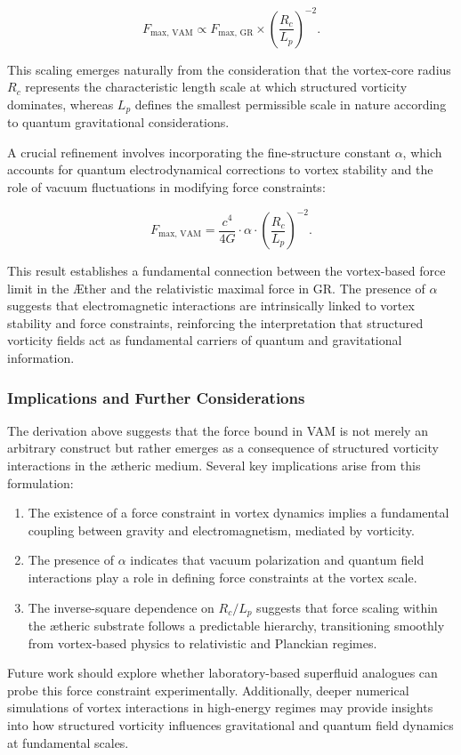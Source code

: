 \begin{equation*}
F_{\text{max, VAM}} \propto F_{\text{max, GR}} \times \left(\frac{R_c}{L_p}\right)^{-2}.
\end{equation*}


This scaling emerges naturally from the consideration that the vortex-core radius $R_c$ represents the characteristic length scale at which structured vorticity dominates, whereas $L_p$ defines the smallest permissible scale in nature according to quantum gravitational considerations.


A crucial refinement involves incorporating the fine-structure constant $\alpha$, which accounts for quantum electrodynamical corrections to vortex stability and the role of vacuum fluctuations in modifying force constraints:


\begin{equation*}
F_{\text{max, VAM}} = \frac{c^4}{4G} \cdot \alpha \cdot \left(\frac{R_c}{L_p}\right)^{-2}.
\end{equation*}


This result establishes a fundamental connection between the vortex-based force limit in the Æther and the relativistic maximal force in GR. The presence of $\alpha$ suggests that electromagnetic interactions are intrinsically linked to vortex stability and force constraints, reinforcing the interpretation that structured vorticity fields act as fundamental carriers of quantum and gravitational information.


\subsubsection*{Implications and Further Considerations}
The derivation above suggests that the force bound in VAM is not merely an arbitrary construct but rather emerges as a consequence of structured vorticity interactions in the ætheric medium. Several key implications arise from this formulation:
\begin{enumerate}
\item The existence of a force constraint in vortex dynamics implies a fundamental coupling between gravity and electromagnetism, mediated by vorticity.
\item The presence of $\alpha$ indicates that vacuum polarization and quantum field interactions play a role in defining force constraints at the vortex scale.
\item The inverse-square dependence on $R_c/L_p$ suggests that force scaling within the ætheric substrate follows a predictable hierarchy, transitioning smoothly from vortex-based physics to relativistic and Planckian regimes.
\end{enumerate}


Future work should explore whether laboratory-based superfluid analogues can probe this force constraint experimentally. Additionally, deeper numerical simulations of vortex interactions in high-energy regimes may provide insights into how structured vorticity influences gravitational and quantum field dynamics at fundamental scales.